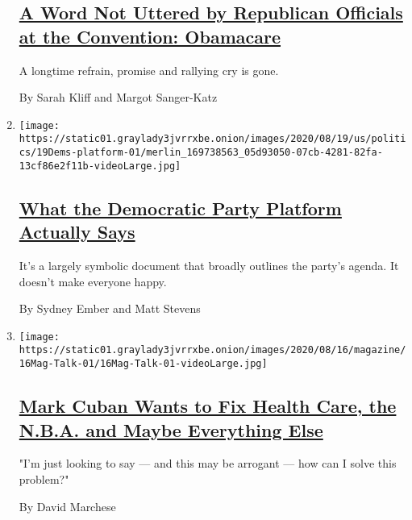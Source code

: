 \begin{enumerate}
  \hypertarget{a-word-not-uttered-by-republican-officials-at-the-convention-obamacare}{%
  \subsection{\texorpdfstring{\href{/2020/08/28/upshot/republican-convention-obamacare.html}{A
  Word Not Uttered by Republican Officials at the Convention:
  Obamacare}}{A Word Not Uttered by Republican Officials at the Convention: Obamacare}}\label{a-word-not-uttered-by-republican-officials-at-the-convention-obamacare}}

  A longtime refrain, promise and rallying cry is gone.

  By Sarah Kliff and Margot Sanger-Katz
\item
  \texttt{[image: https://static01.graylady3jvrrxbe.onion/images/2020/08/19/us/politics/19Dems-platform-01/merlin\_169738563\_05d93050-07cb-4281-82fa-13cf86e2f11b-videoLarge.jpg]}

  \hypertarget{what-the-democratic-party-platform-actually-says}{%
  \subsection{\texorpdfstring{\href{/2020/08/19/us/politics/democratic-party-platform.html}{What
  the Democratic Party Platform Actually
  Says}}{What the Democratic Party Platform Actually Says}}\label{what-the-democratic-party-platform-actually-says}}

  It's a largely symbolic document that broadly outlines the party's
  agenda. It doesn't make everyone happy.

  By Sydney Ember and Matt Stevens
\item
  \texttt{[image: https://static01.graylady3jvrrxbe.onion/images/2020/08/16/magazine/16Mag-Talk-01/16Mag-Talk-01-videoLarge.jpg]}

  \hypertarget{mark-cuban-wants-to-fix-health-care-the-nba-and-maybe-everything-else}{%
  \subsection{\texorpdfstring{\href{/interactive/2020/08/10/magazine/mark-cuban-interview.html}{Mark
  Cuban Wants to Fix Health Care, the N.B.A. and Maybe Everything
  Else}}{Mark Cuban Wants to Fix Health Care, the N.B.A. and Maybe Everything Else}}\label{mark-cuban-wants-to-fix-health-care-the-nba-and-maybe-everything-else}}

  "I'm just looking to say --- and this may be arrogant --- how can I
  solve this problem?"

  By David Marchese
\end{enumerate}

